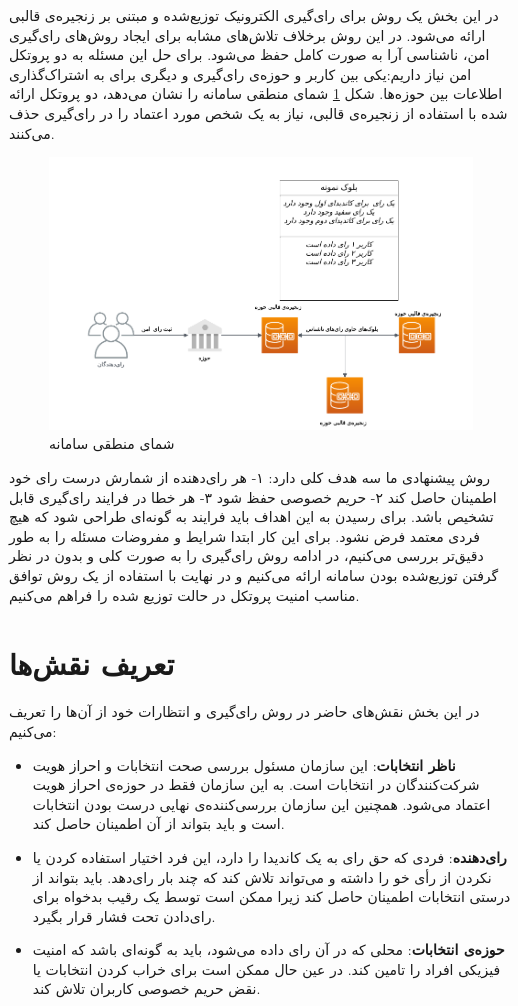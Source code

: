 در این بخش یک روش برای رای‌گیری الکترونیک توزیع‌شده و مبتنی بر زنجیره‌ی قالبی ارائه می‌شود. در این روش برخلاف تلاش‌های مشابه برای ایجاد روش‌های رای‌گیری امن، ناشناسی آرا به صورت کامل حفظ می‌شود. برای حل این مسئله به دو پروتکل امن نیاز داریم:یکی بین کاربر و حوزه‌ی رای‌گیری و دیگری برای به اشتراک‌گذاری اطلاعات بین حوزه‌ها. شکل \ref{fig:toplevel} شمای منطقی سامانه را نشان می‌دهد، دو پروتکل ارائه شده با استفاده از زنجیره‌ی قالبی، نیاز به یک شخص مورد اعتماد را در رای‌گیری حذف می‌کنند.
\begin{figure}[h!]
	\centering
	\includegraphics[width=1\linewidth]{toplevel.png}
	\caption {شمای منطقی سامانه}
	\label{fig:toplevel}
\end{figure}


\par
روش پیشنهادی ما سه هدف کلی دارد: ۱- هر رای‌دهنده از شمارش درست رای خود اطمینان حاصل کند ۲- حریم خصوصی حفظ شود ۳- هر خطا در فرایند رای‌گیری قابل تشخیص باشد. برای رسیدن به این اهداف باید فرایند به گونه‌ای طراحی شود که هیچ فردی معتمد فرض نشود. برای این کار ابتدا شرایط و مفروضات مسئله را به طور دقیق‌تر بررسی می‌کنیم، در ادامه روش رای‌گیری را به صورت کلی و بدون در نظر گرفتن توزیع‌شده بودن سامانه ارائه می‌کنیم و در نهایت با استفاده از یک روش توافق مناسب امنیت پروتکل در حالت توزیع شده را فراهم می‌کنیم. 
\section{تعریف نقش‌ها}
در این بخش نقش‌های حاضر در روش رای‌گیری و انتظارات خود از آن‌ها را تعریف می‌کنیم:
\begin{itemize}
	\item
	\textbf{ناظر انتخابات}:
	این سازمان مسئول بررسی صحت انتخابات و احراز هویت شرکت‌کنندگان در انتخابات است. به این سازمان فقط در حوزه‌ی احراز هویت اعتماد می‌شود. همچنین این سازمان بررسی‌کننده‌ی نهایی درست بودن انتخابات است و باید بتواند از آن اطمینان حاصل کند.
	\item
	\textbf{رای‌دهنده}:
	فردی که حق رای به یک کاندیدا را دارد، این فرد اختیار استفاده کردن یا نکردن از رأی خو را داشته و می‌تواند تلاش کند که چند بار رای‌دهد. باید بتواند از درستی انتخابات اطمینان حاصل کند زیرا ممکن است توسط یک رقیب بدخواه برای رای‌دادن تحت فشار قرار بگیرد.
	\item
	\textbf{حوزه‌ی انتخابات}:
	محلی که در آن رای داده می‌شود، باید به گونه‌ای باشد که امنیت فیزیکی افراد را تامین کند. در عین حال ممکن است برای خراب کردن انتخابات یا نقض حریم خصوصی کاربران تلاش کند. 
\end{itemize}
